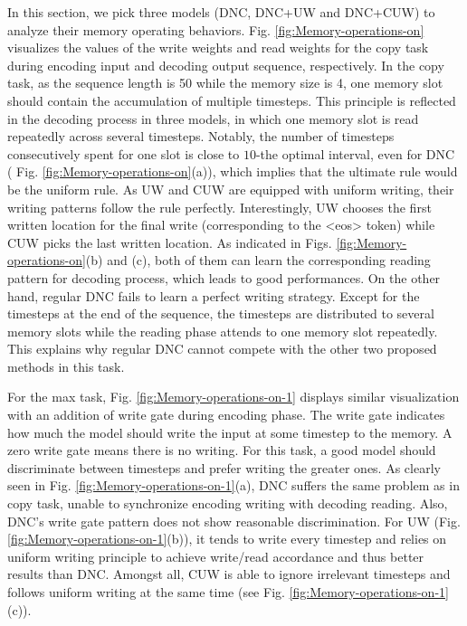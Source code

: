 In this section, we pick three models (DNC, DNC+UW and DNC+CUW) to
analyze their memory operating behaviors. Fig. \ref{fig:Memory-operations-on}
visualizes the values of the write weights and read weights for the
copy task during encoding input and decoding output sequence, respectively.
In the copy task, as the sequence length is 50 while the memory size
is 4, one memory slot should contain the accumulation of multiple
timesteps. This principle is reflected in the decoding process in
three models, in which one memory slot is read repeatedly across several
timesteps. Notably, the number of timesteps consecutively spent for
one slot is close to $10$-the optimal interval, even for DNC ( Fig.
\ref{fig:Memory-operations-on}(a)), which implies that the ultimate
rule would be the uniform rule. As UW and CUW are equipped with uniform
writing, their writing patterns follow the rule perfectly. Interestingly,
UW chooses the first written location for the final write (corresponding
to the \textless eos\textgreater{} token) while CUW picks the last
written location. As indicated in Figs. \ref{fig:Memory-operations-on}(b)
and (c), both of them can learn the corresponding reading pattern
for decoding process, which leads to good performances. On the other
hand, regular DNC fails to learn a perfect writing strategy. Except
for the timesteps at the end of the sequence, the timesteps are distributed
to several memory slots while the reading phase attends to one memory
slot repeatedly. This explains why regular DNC cannot compete with
the other two proposed methods in this task. 

For the max task, Fig. \ref{fig:Memory-operations-on-1} displays
similar visualization with an addition of write gate during encoding
phase. The write gate indicates how much the model should write the
input at some timestep to the memory. A zero write gate means there
is no writing. For this task, a good model should discriminate between
timesteps and prefer writing the greater ones. As clearly seen in
Fig. \ref{fig:Memory-operations-on-1}(a), DNC suffers the same problem
as in copy task, unable to synchronize encoding writing with decoding
reading. Also, DNC's write gate pattern does not show reasonable discrimination.
For UW (Fig. \ref{fig:Memory-operations-on-1}(b)), it tends to write
every timestep and relies on uniform writing principle to achieve
write/read accordance and thus better results than DNC. Amongst all,
CUW is able to ignore irrelevant timesteps and follows uniform writing
at the same time (see Fig. \ref{fig:Memory-operations-on-1}(c)).


